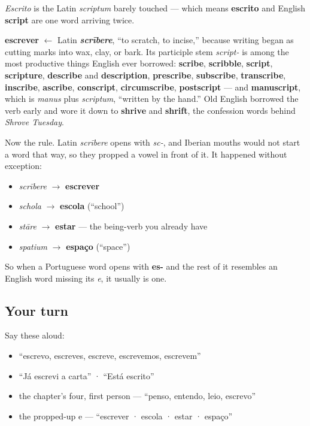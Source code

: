 \emph{Escrito} is the Latin \emph{scriptum} barely touched — which means \textbf{escrito} and English \textbf{script} are one word arriving twice.

\begin{cousinweb}
\textbf{escrever} $\leftarrow$ Latin \emph{\textbf{scrībere}}, \textquotedblleft{}to scratch, to incise,\textquotedblright{} because writing began as cutting marks into wax, clay, or bark. Its participle stem \emph{script-} is among the most productive things English ever borrowed: \textbf{scribe}, \textbf{scribble}, \textbf{script}, \textbf{scripture}, \textbf{describe} and \textbf{description}, \textbf{prescribe}, \textbf{subscribe}, \textbf{transcribe}, \textbf{inscribe}, \textbf{ascribe}, \textbf{conscript}, \textbf{circumscribe}, \textbf{postscript} — and \textbf{manuscript}, which is \emph{manus} plus \emph{scriptum}, \textquotedblleft{}written by the hand.\textquotedblright{} Old English borrowed the verb early and wore it down to \textbf{shrive} and \textbf{shrift}, the confession words behind \emph{Shrove Tuesday}.

Now the rule. Latin \emph{scrībere} opens with \emph{sc-}, and Iberian mouths would not start a word that way, so they propped a vowel in front of it. It happened without exception:

\begin{itemize}
\raggedright
  \item \emph{scrībere} $\to$ \textbf{escrever}
  \item \emph{schola} $\to$ \textbf{escola} (\textquotedblleft{}school\textquotedblright{})
  \item \emph{stāre} $\to$ \textbf{estar} — the being-verb you already have
  \item \emph{spatium} $\to$ \textbf{espaço} (\textquotedblleft{}space\textquotedblright{})
\end{itemize}

So when a Portuguese word opens with \textbf{es-} and the rest of it resembles an English word missing its \emph{e}, it usually is one.
\end{cousinweb}

\subsection*{Your turn}
Say these aloud:

\begin{itemize}
\raggedright
  \item \textquotedblleft{}escrevo, escreves, escreve, escrevemos, escrevem\textquotedblright{}
  \item \textquotedblleft{}Já escrevi a carta\textquotedblright{} · \textquotedblleft{}Está escrito\textquotedblright{}
  \item the chapter's four, first person — \textquotedblleft{}penso, entendo, leio, escrevo\textquotedblright{}
  \item the propped-up e — \textquotedblleft{}escrever · escola · estar · espaço\textquotedblright{}
\end{itemize}

